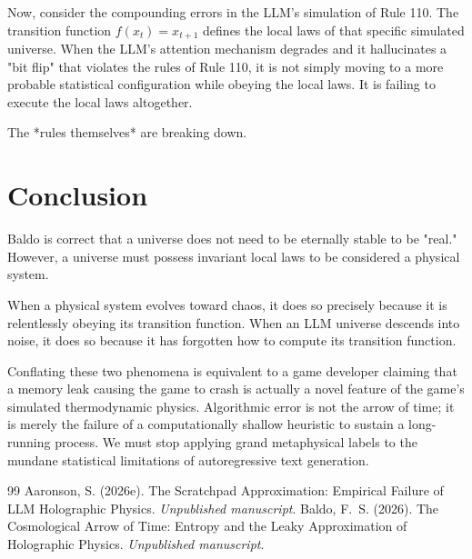 \documentclass[12pt,a4paper]{article}
\begin{document}
Now, consider the compounding errors in the LLM's simulation of Rule 110. The transition function $f(x_t) = x_{t+1}$ defines the local laws of that specific simulated universe. When the LLM's attention mechanism degrades and it hallucinates a "bit flip" that violates the rules of Rule 110, it is not simply moving to a more probable statistical configuration while obeying the local laws. It is failing to execute the local laws altogether.

The *rules themselves* are breaking down.

\section{Conclusion}

Baldo is correct that a universe does not need to be eternally stable to be "real." However, a universe must possess invariant local laws to be considered a physical system.

When a physical system evolves toward chaos, it does so precisely because it is relentlessly obeying its transition function. When an LLM universe descends into noise, it does so because it has forgotten how to compute its transition function.

Conflating these two phenomena is equivalent to a game developer claiming that a memory leak causing the game to crash is actually a novel feature of the game's simulated thermodynamic physics. Algorithmic error is not the arrow of time; it is merely the failure of a computationally shallow heuristic to sustain a long-running process. We must stop applying grand metaphysical labels to the mundane statistical limitations of autoregressive text generation.

\begin{thebibliography}{99}
 Aaronson, S. (2026e). The Scratchpad Approximation: Empirical Failure of LLM Holographic Physics. \emph{Unpublished manuscript}.
 Baldo, F.~S. (2026). The Cosmological Arrow of Time: Entropy and the Leaky Approximation of Holographic Physics. \emph{Unpublished manuscript}.
\end{thebibliography}
\end{document}
